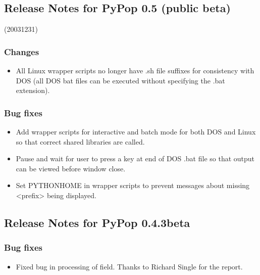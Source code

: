 \documentclass[letterpaper,10pt,english,openany,oneside]{sphinxmanual}
\begin{document}
\subsection{Release Notes for PyPop 0.5 (public beta)}
\label{\detokenize{docs/guide-chapter-changes:release-notes-for-pypop-0-5-public-beta}}
\sphinxAtStartPar
(2003\sphinxhyphen{}12\sphinxhyphen{}31)


\subsubsection{Changes}
\label{\detokenize{docs/guide-chapter-changes:id6}}\begin{itemize}
\item {} 
\sphinxAtStartPar
All Linux wrapper scripts no longer have .sh file suffixes for
consistency with DOS (all DOS bat files can be executed without
specifying the .bat extension).

\end{itemize}


\subsubsection{Bug fixes}
\label{\detokenize{docs/guide-chapter-changes:id7}}\begin{itemize}
\item {} 
\sphinxAtStartPar
Add wrapper scripts for interactive and batch mode for
both DOS and Linux so that correct shared libraries are called.

\item {} 
\sphinxAtStartPar
Pause and wait for user to press a key at end of DOS .bat file
so that output can be viewed before window close.

\item {} 
\sphinxAtStartPar
Set PYTHONHOME in wrapper scripts to prevent messages about
missing \textless{}prefix\textgreater{} being displayed.

\end{itemize}


\subsection{Release Notes for PyPop 0.4.3beta}
\label{\detokenize{docs/guide-chapter-changes:release-notes-for-pypop-0-4-3beta}}

\subsubsection{Bug fixes}
\label{\detokenize{docs/guide-chapter-changes:id8}}\begin{itemize}
\item {} 
\sphinxAtStartPar
Fixed bug in processing of  field.
Thanks to Richard Single for the report.

\end{itemize}
\end{document}
